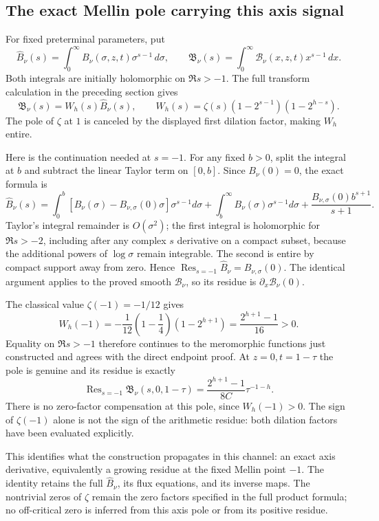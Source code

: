 \subsection{The exact Mellin pole carrying this axis signal}

For fixed preterminal parameters, put
\[
 \widehat B_\nu(s)=\int_0^\infty
                  B_\nu(\sigma,z,t)\sigma^{s-1}\,d\sigma,\qquad
 \mathfrak B_\nu(s)=\int_0^\infty
                  \mathcal B_\nu(x,z,t)x^{s-1}\,dx .
\]
Both integrals are initially holomorphic on \(\Re s>-1\).
The full transform calculation in the preceding section gives
\[
 \mathfrak B_\nu(s)=W_h(s)\widehat B_\nu(s),\qquad
 W_h(s)=\zeta(s)(1-2^{s-1})(1-2^{h-s}).
\]
The pole of \(\zeta\) at \(1\) is canceled by the displayed first
dilation factor, making \(W_h\) entire.

Here is the continuation needed at \(s=-1\). For any fixed \(b>0\),
split the integral at \(b\) and subtract the linear Taylor term on
\([0,b]\). Since \(B_\nu(0)=0\), the exact formula is
\[
 \widehat B_\nu(s)=
 \int_0^b [B_\nu(\sigma)-B_{\nu,\sigma}(0)\sigma]\sigma^{s-1}d\sigma
 +\int_b^\infty B_\nu(\sigma)\sigma^{s-1}d\sigma
 +\frac{B_{\nu,\sigma}(0)b^{s+1}}{s+1}.
\]
Taylor's integral remainder is \(O(\sigma^2)\); the first integral
is holomorphic for \(\Re s>-2\), including after any complex
\(s\) derivative on a compact subset, because the additional powers
of \(\log\sigma\) remain integrable. The second is entire by compact
support away from zero. Hence
\(\operatorname{Res}_{s=-1}\widehat B_\nu=B_{\nu,\sigma}(0)\).
The identical argument applies to the proved smooth
\(\mathcal B_\nu\), so its residue is \(\partial_x\mathcal B_\nu(0)\).

The classical value \(\zeta(-1)=-1/12\)
\cite[\S25.6(i)]{apostolDLMF25} gives
\[
 W_h(-1)=-\frac1{12}\left(1-\frac14\right)(1-2^{h+1})
         =\frac{2^{h+1}-1}{16}>0.
\]
Equality on \(\Re s>-1\) therefore continues to the meromorphic
functions just constructed and agrees with the direct endpoint proof.
At \(z=0,t=1-\tau\) the pole is genuine and its residue is exactly
\begin{equation}\label{naj:residue}
 \operatorname{Res}_{s=-1}\mathfrak B_\nu(s,0,1-\tau)
     =\frac{2^{h+1}-1}{8C}\tau^{-1-h}.
\end{equation}
There is no zero-factor compensation at this pole, since \(W_h(-1)>0\).
The sign of \(\zeta(-1)\) alone is not the sign of the arithmetic
residue: both dilation factors have been evaluated explicitly.

This identifies what the construction propagates in this channel:
an exact axis derivative, equivalently a growing residue at the fixed
Mellin point \(-1\). The identity retains the full
\(\widehat B_\nu\), its flux equations, and its inverse maps.
The nontrivial zeros of \(\zeta\) remain the zero factors specified
in the full product formula; no off-critical zero is inferred from
this axis pole or from its positive residue.

